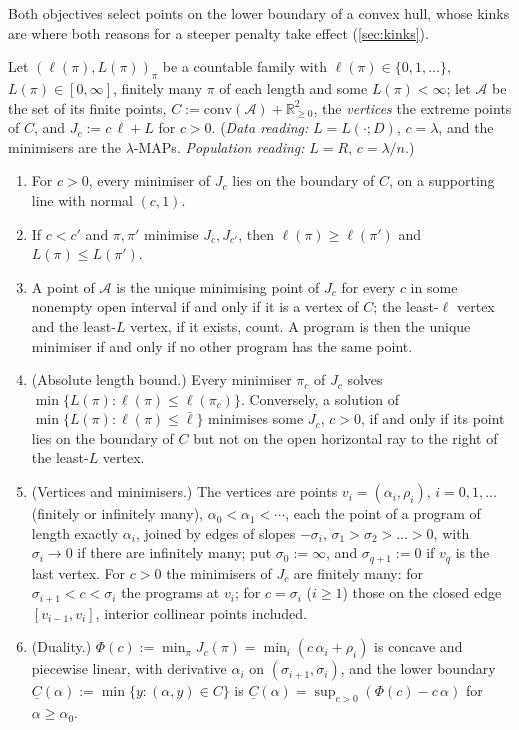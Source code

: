 Both objectives select points on the lower boundary of a convex hull, whose kinks are where both reasons for a steeper penalty take effect (\cref{sec:kinks}).

\begin{lemma}\label{lem:setup:hull}
Let $(\ell(\pi),L(\pi))_\pi$ be a countable family with $\ell(\pi)\in\{0,1,\dots\}$, $L(\pi)\in[0,\infty]$, finitely many $\pi$ of each length and some $L(\pi)<\infty$; let $\mathcal A$ be the set of its finite points, $C:=\mathrm{conv}(\mathcal A)+\mathbb R^2_{\ge0}$, the \emph{vertices} the extreme points of $C$, and $J_c:=c\,\ell+L$ for $c>0$. (\emph{Data reading:} $L=L(\cdot;D)$, $c=\lambda$, and the minimisers are the $\lambda$-MAPs. \emph{Population reading:} $L=R$, $c=\lambda/n$.)
\begin{enumerate}[label=(\roman*),itemsep=0pt,topsep=2pt]
\item For $c>0$, every minimiser of $J_c$ lies on the boundary of $C$, on a supporting line with normal $(c,1)$.
\item If $c<c'$ and $\pi,\pi'$ minimise $J_c,J_{c'}$, then $\ell(\pi)\ge\ell(\pi')$ and $L(\pi)\le L(\pi')$.
\item A point of $\mathcal A$ is the unique minimising point of $J_c$ for every $c$ in some nonempty open interval if and only if it is a vertex of $C$; the least-$\ell$ vertex and the least-$L$ vertex, if it exists, count. A program is then the unique minimiser if and only if no other program has the same point.
\item (Absolute length bound.) Every minimiser $\pi_c$ of $J_c$ solves $\min\{L(\pi):\ell(\pi)\le\ell(\pi_c)\}$. Conversely, a solution of $\min\{L(\pi):\ell(\pi)\le\bar\ell\}$ minimises some $J_c$, $c>0$, if and only if its point lies on the boundary of $C$ but not on the open horizontal ray to the right of the least-$L$ vertex.
\item (Vertices and minimisers.) The vertices are points $v_i=(\alpha_i,\rho_i)$, $i=0,1,\dots$ (finitely or infinitely many), $\alpha_0<\alpha_1<\cdots$, each the point of a program of length exactly $\alpha_i$, joined by edges of slopes $-\sigma_i$, $\sigma_1>\sigma_2>\dots>0$, with $\sigma_i\to0$ if there are infinitely many; put $\sigma_0:=\infty$, and $\sigma_{q+1}:=0$ if $v_q$ is the last vertex. For $c>0$ the minimisers of $J_c$ are finitely many: for $\sigma_{i+1}<c<\sigma_i$ the programs at $v_i$; for $c=\sigma_i$ ($i\ge1$) those on the closed edge $[v_{i-1},v_i]$, interior collinear points included.
\item (Duality.) $\Phi(c):=\min_\pi J_c(\pi)=\min_i(c\,\alpha_i+\rho_i)$ is concave and piecewise linear, with derivative $\alpha_i$ on $(\sigma_{i+1},\sigma_i)$, and the lower boundary $\underline C(\alpha):=\min\{y:(\alpha,y)\in C\}$ is $\underline C(\alpha)=\sup_{c>0}(\Phi(c)-c\,\alpha)$ for $\alpha\ge\alpha_0$.
\end{enumerate}
\end{lemma}

